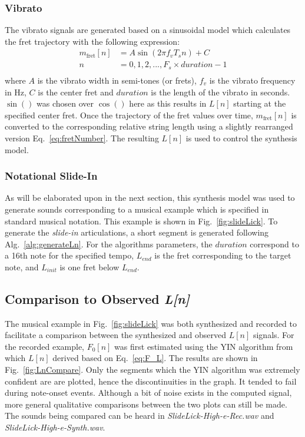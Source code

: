 \documentclass[../main.tex]{subfiles}
\begin{document}
\subsubsection{Vibrato}
The vibrato signals are generated based on a sinusoidal model which calculates the fret trajectory with the following expression:
\begin{align}
    m_{\text{fret}}[n] &= A\sin(2\pi f_v T_s n) + C\\
    n & = 0, 1, 2, ... , F_s\times  duration - 1\\
\end{align}
where $A$ is the vibrato width in semi-tones (or frets), $f_v$ is the vibrato frequency in Hz, $C$ is the center fret and $duration$ is the length of the vibrato in seconds. $\sin()$ was chosen over $\cos()$ here as this results in $L[n]$ starting at the specified center fret. Once the trajectory of the fret values over time, $m_{\text{fret}}[n]$ is converted to the corresponding relative string length using a slightly rearranged version Eq.~\ref{eq:fretNumber}. The resulting $L[n]$ is used to control the synthesis model.

\subsubsection{Notational Slide-In}
As will be elaborated upon in the next section, this synthesis model was used to generate sounds corresponding to a musical example which is specified in standard musical notation. This example is shown in Fig.~\ref{fig:slideLick}. To generate the \emph{slide-in} articulations, a short segment is generated following Alg.~\ref{alg:generateLn}. For the algorithms parameters, the $duration$ correspond to  a 16th note for the specified tempo, $L_{end}$ is the fret corresponding to the target note, and $L_{init}$ is one fret below $L_{end}$.

\subsection{Comparison to Observed \emph{L[n]}}
The musical example in Fig.~\ref{fig:slideLick} was both synthesized and recorded to facilitate a comparison between the synthesized and observed $L[n]$ signals. For the recorded example, $F_0[n]$ was first estimated using the YIN algorithm  from which $L[n]$ derived based on Eq.~\ref{eq:F_L}. The results are shown in Fig.~\ref{fig:LnCompare}. Only the segments which the YIN algorithm was extremely confident are are plotted, hence the discontinuities in the graph. It tended to fail during note-onset events. Although a bit of noise exists in the computed signal, more general qualitative comparisons between the two plots can still be made. The sounds being compared can be heard in \emph{SlideLick-High-e-Rec.wav} and \emph{SlideLick-High-e-Synth.wav}.
\end{document}
